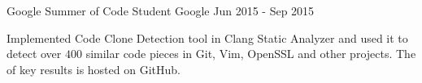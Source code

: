 \begin{cventries}
  \cventry
    {Google Summer of Code Student}
    {Google}
    {}
    {Jun 2015 - Sep 2015}
    {
      \begin{cvitems}
        Implemented Code Clone Detection tool in Clang Static Analyzer and used
        it to detect over $400$ similar code pieces in Git, Vim, OpenSSL and
        other projects. The
        of key results is hosted on GitHub.
      \end{cvitems}
    }


\end{cventries}
